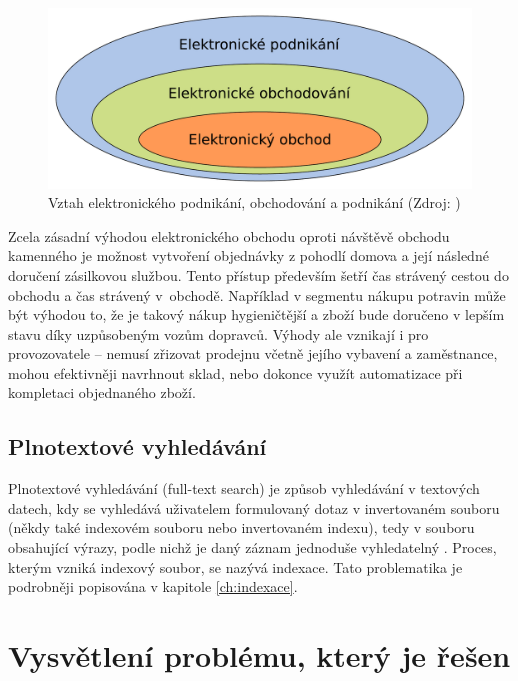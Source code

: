 \documentclass[FM,DP]{tulthesis}
\begin{document}
\begin{figure}[h]
\center
\includegraphics[width=\textwidth]{e-commerce.pdf}
\caption[Vztah elektronického podnikání, obchodování a podnikání]{Vztah elektronického podnikání, obchodování a podnikání (Zdroj: \cite{strossa})}
\label{e-commerce}
\end{figure}

Zcela zásadní výhodou elektronického obchodu oproti návštěvě obchodu kamenného
je možnost vytvoření objednávky z pohodlí domova a její následné doručení zásilkovou 
službou. Tento přístup především šetří čas strávený cestou do obchodu a čas strávený 
v~obchodě. Například v segmentu nákupu potravin může být výhodou to, že je takový 
nákup hygieničtější a zboží bude doručeno v lepším stavu díky uzpůsobeným vozům dopravců.
Výhody ale vznikají i pro provozovatele -- nemusí zřizovat prodejnu včetně jejího vybavení a 
zaměstnance, mohou efektivněji navrhnout sklad, nebo dokonce využít automatizace 
při kompletaci objednaného zboží.

\subsection*{Plnotextové vyhledávání}

Plnotextové vyhledávání (full-text search) je způsob vyhledávání v textových datech, 
kdy se vyhledává uživatelem formulovaný dotaz v invertovaném souboru (někdy také 
indexovém souboru nebo invertovaném indexu), tedy v souboru obsahující výrazy, 
podle nichž je daný záznam jednoduše vyhledatelný \cite[strana~15]{strossa}. 
Proces, kterým vzniká indexový soubor, se nazývá indexace. Tato problematika je podrobněji
popisována v kapitole \ref{ch:indexace}.

\section{Vysvětlení problému, který je řešen}
\end{document}
